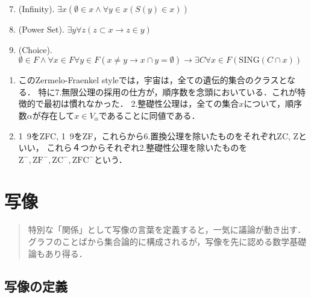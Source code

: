\documentclass[uplatex,dvipdfmx]{jsreport}
\begin{document}
\begin{shadebox}
\begin{definition}[集合の公理系ZF]
\begin{screen}
\begin{notation}
            \end{notation}
        \end{screen}
        \begin{enumerate}\setcounter{enumi}{6}
            \item (Infinity). $\exists x(\emptyset\in x\land \forall y\in x(S(y)\in x))$
            \item (Power Set). $\exists y\forall z(z\subset x\rightarrow z\in y)$
            \item (Choice). $\emptyset\in F\land\forall x\in F\forall y\in F(x\ne y\rightarrow x\cap y=\emptyset)\rightarrow \exists C\forall x\in F(\mathrm{SING}(C\cap x))$
        \end{enumerate}
    \end{definition}
\end{shadebox}
\begin{remark}\mbox{}
    \begin{enumerate}
        \item このZermelo-Fraenkel styleでは，宇宙は，全ての遺伝的集合のクラスとなる．
        特に7.無限公理の採用の仕方が，順序数を念頭においている．これが特徴的で最初は慣れなかった．
        2.整礎性公理は，全ての集合$x$について，順序数$\alpha$が存在して$x\in V_\alpha$であることに同値である．
        \item 1~9をZFC, 1~9をZF，これらから6.置換公理を除いたものをそれぞれZC, Zといい，
        これら４つからそれぞれ2.整礎性公理を除いたものを$\mathrm{Z^-,ZF^-,ZC^-,ZFC^-}$という．
    \end{enumerate} 
\end{remark}


\chapter{写像}

\begin{quotation}
    特別な「関係」として写像の言葉を定義すると，一気に議論が動き出す．
    グラフのことばから集合論的に構成されるが，写像を先に認める数学基礎論もあり得る．
\end{quotation}

\section{写像の定義}
\end{document}
